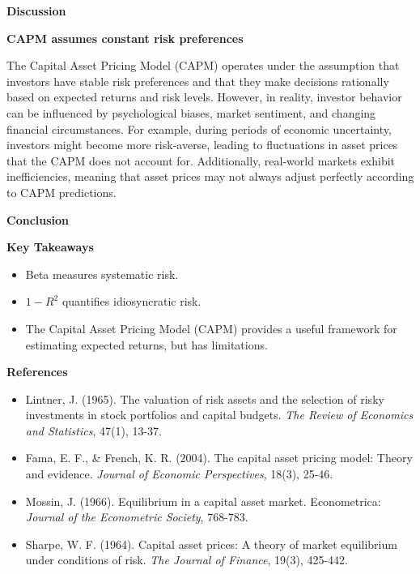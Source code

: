 \documentclass{beamer}
\begin{document}
\begin{frame}{\textbf{Discussion}}
\begin{block}{\textbf{CAPM assumes constant risk preferences}}

The Capital Asset Pricing Model (CAPM) operates under the assumption that investors have stable risk preferences and that they make decisions rationally based on expected returns and risk levels. However, in reality, investor behavior can be influenced by psychological biases, market sentiment, and changing financial circumstances. For example, during periods of economic uncertainty, investors might become more risk-averse, leading to fluctuations in asset prices that the CAPM does not account for. Additionally, real-world markets exhibit inefficiencies, meaning that asset prices may not always adjust perfectly according to CAPM predictions.

\end{block}
\end{frame}

\begin{frame}{\textbf{Conclusion}}
\begin{block}{\textbf{Key Takeaways}}
\begin{itemize}
	\item Beta measures systematic risk.
	\item \( 1-R^2 \) quantifies idiosyncratic risk.
	\item The Capital Asset Pricing Model (CAPM) provides a useful framework for estimating expected returns, but has limitations.
\end{itemize}
\end{block}
\end{frame}

\begin{frame}{\textbf{References}}

		\begin{itemize}
\item Lintner, J. (1965). The valuation of risk assets and the selection of risky investments in stock portfolios and capital budgets. \textit{The Review of Economics and Statistics}, 47(1), 13-37.
\item Fama, E. F., \& French, K. R. (2004). The capital asset pricing model: Theory and evidence. \textit{Journal of Economic Perspectives}, 18(3), 25-46.
\item Mossin, J. (1966). Equilibrium in a capital asset market. Econometrica: \textit{Journal of the Econometric Society}, 768-783. 
		
\item Sharpe, W. F. (1964). Capital asset prices: A theory of market equilibrium under conditions of risk. \textit{The Journal of Finance}, 19(3), 425-442. 
\end{itemize}

\end{frame}
\end{document}
